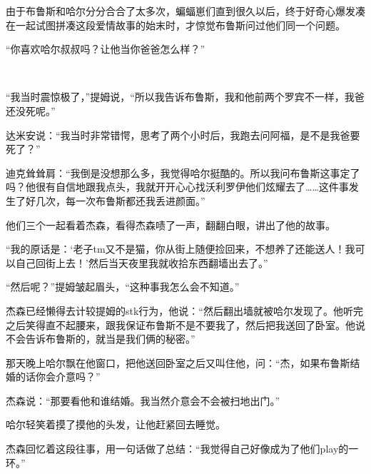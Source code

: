 由于布鲁斯和哈尔分分合合了太多次，蝙蝠崽们直到很久以后，终于好奇心爆发凑在一起试图拼凑这段爱情故事的始末时，才惊觉布鲁斯问过他们同一个问题。

“你喜欢哈尔叔叔吗？让他当你爸爸怎么样？”

~\

“我当时震惊极了，”提姆说，“所以我告诉布鲁斯，我和他前两个罗宾不一样，我爸还没死呢。”

达米安说：“我当时非常错愕，思考了两个小时后，我跑去问阿福，是不是我爸要死了？”

迪克耸耸肩：“我倒是没想那么多，我觉得哈尔挺酷的。所以我问布鲁斯这事定了吗？他很有自信地跟我点头，我就开开心心找沃利罗伊他们炫耀去了……这件事发生了好几次，每一次布鲁斯都还我丢进颜面。”

他们三个一起看着杰森，看得杰森啧了一声，翻翻白眼，讲出了他的故事。

“我的原话是：‘老子tm又不是猫，你从街上随便捡回来，不想养了还能送人！我可以自己回街上去！’然后当天夜里我就收拾东西翻墙出去了。”

“然后呢？”提姆皱起眉头，“这种事我怎么会不知道。”

杰森已经懒得去计较提姆的stk行为，他说：“然后翻出墙就被哈尔发现了。他听完之后笑得直不起腰来，跟我保证布鲁斯不是不要我了，然后把我送回了卧室。他说不会告诉布鲁斯的，就当是我们俩的秘密。”

那天晚上哈尔飘在他窗口，把他送回卧室之后又叫住他，问：“杰，如果布鲁斯结婚的话你会介意吗？”

杰森说：“那要看他和谁结婚。我当然介意会不会被扫地出门。”

哈尔轻笑着摸了摸他的头发，让他赶紧回去睡觉。

杰森回忆着这段往事，用一句话做了总结：“我觉得自己好像成为了他们play的一环。”

~\


